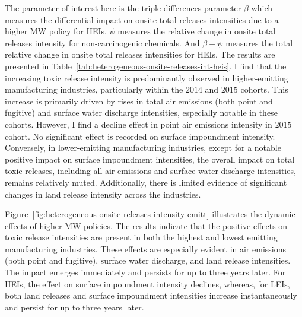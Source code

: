 \documentclass{C:/Users/david/OneDrive/Documents/ULMS/PhD/Thesis/chapter3/src/climate_change/latex/Economic_Journal/OUP-EJ}
\begin{document}
    The parameter of interest here is the triple-differences parameter $\beta$ which measures the differential impact on onsite total releases intensities due to a higher MW policy for HEIs. $\psi$ measures the relative change in onsite total releases intensity for non-carcinogenic chemicals. And $\beta + \psi$ measures the total relative change in onsite total releases intensities for HEIs. The results are presented in Table~\ref{tab:heterogeneous-onsite-releases-int-heis}. I find that the increasing toxic release intensity is predominantly observed in higher-emitting manufacturing industries, particularly within the $2014$ and $2015$ cohorts. This increase is primarily driven by rises in total air emissions (both point and fugitive) and surface water discharge intensities, especially notable in these cohorts. However, I find a decline effect in point air emissions intensity in $2015$ cohort. No significant effect is recorded on surface impoundment intensity. Conversely, in lower-emitting manufacturing industries, except for a notable positive impact on surface impoundment intensities, the overall impact on total toxic releases, including all air emissions and surface water discharge intensities, remains relatively muted. Additionally, there is limited evidence of significant changes in land release intensity across the industries.
    

    Figure~\ref{fig:heterogeneous-onsite-releases-intensity-emitt} illustrates the dynamic effects of higher MW policies. The results indicate that the positive effects on toxic release intensities are present in both the highest and lowest emitting manufacturing industries. These effects are especially evident in air emissions (both point and fugitive), surface water discharge, and land release intensities. The impact emerges immediately and persists for up to three years later. For HEIs, the effect on surface impoundment intensity declines, whereas, for LEIs, both land releases and surface impoundment intensities increase instantaneously and persist for up to three years later.
\end{document}
